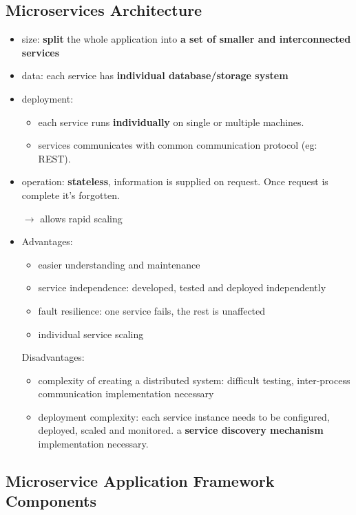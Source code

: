 \subsection{Microservices Architecture}
\begin{itemize}
	\item size: \textbf{split} the whole application into \textbf{a set of smaller and interconnected services}
	
	\item data: each service has \textbf{individual database/storage system}
	\item deployment: 
	\begin{itemize}
		\item each service runs \textbf{individually} on single or multiple machines.
		\item services communicates with common communication protocol (eg: REST).
	\end{itemize}
	\item operation: \textbf{stateless}, information is supplied on request. Once request is complete it's forgotten. 
	
	$\rightarrow$ allows rapid scaling
	
	\item Advantages:
	\begin{itemize}
		\item easier understanding and maintenance
		\item service independence: developed, tested and deployed independently
		\item fault resilience: one service fails, the rest is unaffected
		\item individual service scaling
	\end{itemize}
	Disadvantages:
	\begin{itemize}
		\item complexity of creating a distributed system: difficult testing, inter-process communication implementation necessary
		\item deployment complexity: each service instance needs to be configured, deployed, scaled and monitored. a \textbf{service discovery mechanism} implementation necessary.
	\end{itemize}

\end{itemize}

\subsection{Microservice Application Framework Components}
